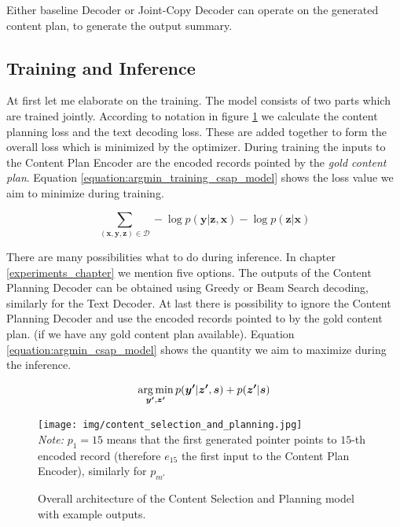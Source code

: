 Either baseline Decoder or Joint-Copy Decoder can operate on the generated content plan, to generate the output summary.

\subsection{Training and Inference}

At first let me elaborate on the training. The model consists of two parts which are trained jointly. According to notation in figure \ref{figure:overal_architecture_csap} we calculate the content planning loss and the text decoding loss. These are added together to form the overall loss which is minimized by the optimizer. During training the inputs to the Content Plan Encoder are the encoded records pointed by the \emph{gold content plan}. Equation \ref{equation:argmin_training_csap_model} shows the loss value we aim to minimize during training.

\begin{equation} \label{equation:argmin_training_csap_model}
    \sum_{(\boldsymbol{x}, \boldsymbol{y}, \boldsymbol{z}) \in \mathcal{D}} - \log{p(\boldsymbol{y}|\boldsymbol{z}, \boldsymbol{x})} - \log{p(\boldsymbol{z} | \boldsymbol{x})}
\end{equation}

There are many possibilities what to do during inference. In chapter \ref{experiments_chapter} we mention five options. The outputs of the Content Planning Decoder can be obtained using Greedy or Beam Search decoding, similarly for the Text Decoder. At last there is possibility to ignore the Content Planning Decoder and use the encoded records pointed to by the gold content plan. (if we have any gold content plan available). Equation \ref{equation:argmin_csap_model} shows the quantity we aim to maximize during the inference.

\begin{equation} \label{equation:argmin_csap_model}
    \operatorname*{arg\,min}_{\boldsymbol{y'}, \boldsymbol{z'}}{p(\boldsymbol{y'}|\boldsymbol{z'}, \boldsymbol{s}) + p(\boldsymbol{z'} | \boldsymbol{s})}
\end{equation}

\begin{figure}[!h]
    \centering
    \texttt{[image: img/content\_selection\_and\_planning.jpg]}
    \footnotesize{\\ \textit{Note:} $p_1 = 15$ means that the first generated pointer points to $15$-th encoded record (therefore $e_{15}$ the first input to the Content Plan Encoder), similarly for $p_{m'}$}
    \caption{Overall architecture of the Content Selection and Planning model with example outputs.} \label{figure:overal_architecture_csap}
\end{figure}
